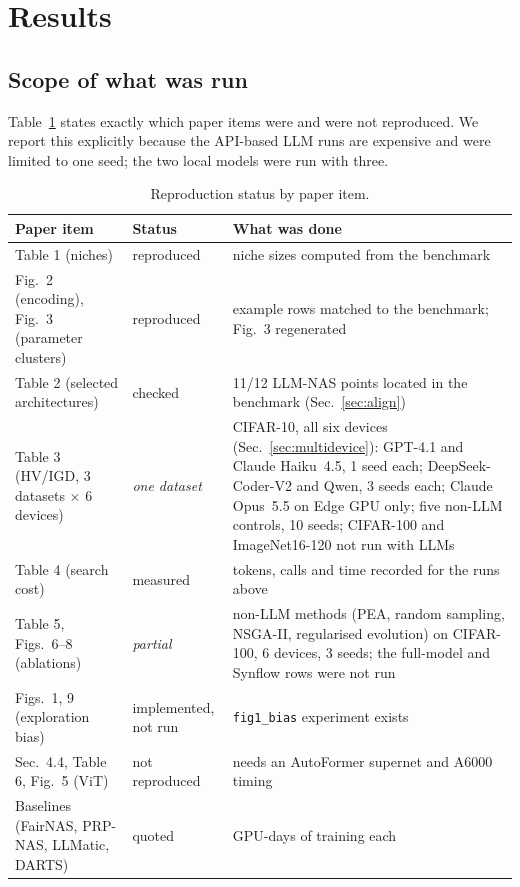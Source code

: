 \documentclass[pdflatex,sn-mathphys-ay]{sn-jnl}
\newcommand{\code}[1]{\texttt{#1}}
\begin{document}
\section{Results}\label{sec:results}

\subsection{Scope of what was run}
Table~\ref{tab:scope} states exactly which paper items were and were not reproduced. We report this explicitly because the API-based LLM runs are expensive and were limited to one seed; the two local models were run with three.
\begin{table}[h]\centering\footnotesize\setlength{\tabcolsep}{3pt}
\caption{Reproduction status by paper item.}\label{tab:scope}
\begin{tabular}{p{3.4cm}p{1.8cm}p{6.3cm}}
\toprule
Paper item & Status & What was done \\
\midrule
Table 1 (niches) & reproduced & niche sizes computed from the benchmark \\
Fig.~2 (encoding), Fig.~3 (parameter clusters) & reproduced & example rows matched to the benchmark; Fig.~3 regenerated \\
Table 2 (selected architectures) & checked & 11/12 LLM-NAS points located in the benchmark (Sec.~\ref{sec:align}) \\
Table 3 (HV/IGD, 3 datasets $\times$ 6 devices) & \emph{one dataset} & CIFAR-10, all six devices (Sec.~\ref{sec:multidevice}): GPT-4.1 and Claude Haiku~4.5, 1 seed each; DeepSeek-Coder-V2 and Qwen, 3 seeds each; Claude Opus~5.5 on Edge GPU only; five non-LLM controls, 10 seeds; CIFAR-100 and ImageNet16-120 not run with LLMs \\
Table 4 (search cost) & measured & tokens, calls and time recorded for the runs above \\
Table 5, Figs.~6--8 (ablations) & \emph{partial} & non-LLM methods (PEA, random sampling, NSGA-II, regularised evolution) on CIFAR-100, 6 devices, 3 seeds; the full-model and Synflow rows were not run \\
Figs.~1, 9 (exploration bias) & implemented, not run & \code{fig1\_bias} experiment exists \\
Sec.~4.4, Table 6, Fig.~5 (ViT) & not reproduced & needs an AutoFormer supernet and A6000 timing \\
Baselines (FairNAS, PRP-NAS, LLMatic, DARTS) & quoted & GPU-days of training each \\
\bottomrule
\end{tabular}
\end{table}
\end{document}
